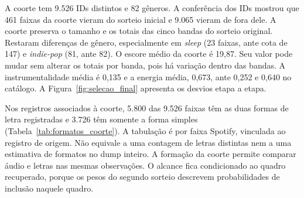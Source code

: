 A coorte tem 9.526 IDs distintos e 82 gêneros. A conferência dos IDs mostrou que 461 faixas da coorte vieram do sorteio inicial e 9.065 vieram de fora dele. A coorte preserva o tamanho e os totais das cinco bandas do sorteio original. Restaram diferenças de gênero, especialmente em \textit{sleep} (23 faixas, ante cota de 147) e \textit{indie-pop} (81, ante 82). O escore médio da coorte é 19,87. Seu valor pode mudar sem alterar os totais por banda, pois há variação dentro das bandas. A instrumentalidade média é 0,135 e a energia média, 0,673, ante 0,252 e 0,640 no catálogo. A Figura~\ref{fig:selecao_final} apresenta os desvios etapa a etapa.




Nos registros associados à coorte, 5.800 das 9.526 faixas têm as duas formas de letra registradas e 3.726 têm somente a forma simples (Tabela~\ref{tab:formatos_coorte}). A tabulação é por faixa Spotify, vinculada ao registro de origem. Não equivale a uma contagem de letras distintas nem a uma estimativa de formatos no dump inteiro. A formação da coorte permite comparar áudio e letras nas mesmas observações. O alcance fica condicionado ao quadro recuperado, porque os pesos do segundo sorteio descrevem probabilidades de inclusão naquele quadro.

